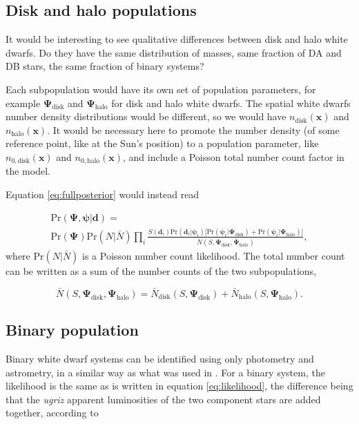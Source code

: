 \documentclass[fleqn,usenatbib]{mnras}
\newcommand{\popp}{\boldsymbol{\Psi}}
\newcommand{\objp}{\boldsymbol{\psi}}
\newcommand{\data}{\mathbf{d}}
\newcommand{\pr}{\text{Pr}}
\begin{document}
\subsection{Disk and halo populations}

It would be interesting to see qualitative differences between disk and halo white dwarfs. Do they have the same distribution of masses, same fraction of DA and DB stars, the same fraction of binary systems?

Each subpopulation would have its own set of population parameters, for example $\popp_\text{disk}$ and $\popp_\text{halo}$ for disk and halo white dwarfs. The spatial white dwarfs number density distributions would be different, so we would have $n_\text{disk}(\mathbf{x})$ and $n_\text{halo}(\mathbf{x})$. It would be necessary here to promote the number density (of some reference point, like at the Sun's position) to a population parameter, like $n_{0,\text{disk}}(\mathbf{x})$ and $n_{0,\text{halo}}(\mathbf{x})$, and include a Poisson total number count factor in the model.

Equation \eqref{eq:fullposterior} would instead read

\begin{equation}\label{eq:posterior_disk_halo}
\begin{split}
	\pr(\popp,\objp | \data ) = \\ \pr(\popp) \pr(N | \bar{N}) 
	\prod_i \frac{S(\data_i) \pr(\data_i | \objp_i) \Big[ \pr(\objp_i | \popp_\text{disk})+\pr(\objp_i | \popp_\text{halo}) \Big]}{\bar{N}(S,\popp_\text{disk},\popp_\text{halo})},
\end{split}
\end{equation}
where $\pr(N | \bar{N})$ is a Poisson number count likelihood. The total number count can be written as a sum of the number counts of the two subpopulations,

\begin{equation}
	\bar{N}(S,\popp_\text{disk},\popp_\text{halo})=\bar{N}_\text{disk}(S,\popp_\text{disk})+\bar{N}_\text{halo}(S,\popp_\text{halo}).
\end{equation}







\subsection{Binary population}

Binary white dwarf systems can be identified using only photometry and astrometry, in a similar way as what was used in \cite{2018ApJ...857..114W}. For a binary system, the likelihood is the same as is written in equation \eqref{eq:likelihood}, the difference being that the \emph{ugriz} apparent luminosities of the two component stars are added together, according to
\end{document}
